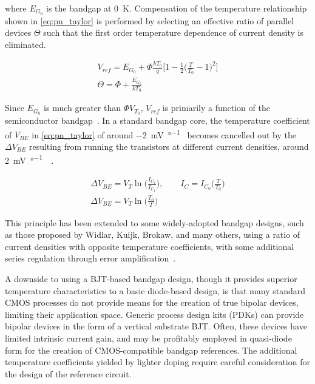 \documentclass[journal]{IEEEtran}
\begin{document}
\noindent where \(E_{G_0}\) is the bandgap at \qty{0}{\K}. Compensation of the temperature relationship shown in \cref{eq:pn_taylor} is performed by selecting an effective ratio of parallel devices \(\Theta\) such that the first order temperature dependence of current density is eliminated.

\begin{gather}
    V_{ref} = E_{G_0} + \Phi\frac{kT_0}{q}\biggl[1 - \frac{1}{2}\biggl(\frac{T}{T_0} - 1\biggr)^2\biggr] \label{eq:bg_vout}\\
    \Theta = \Phi + \frac{E_{G_0}}{kT_0} \label{eq:hilbiber}
\end{gather}

\noindent Since \(E_{G_0}\) is much greater than \(\Phi V_{T_0}\), \(V_{ref}\) is primarily a function of the semiconductor bandgap~\cite{Hibiber1964}. In a standard bandgap core, the temperature coefficient of \(V_{BE}\) in \cref{eq:pn_taylor} of around \qty{-2}{\mV\per\degree\C} becomes cancelled out by the \(\Delta V_{BE}\) resulting from running the transistors at different current densities, around \qty{+2}{\mV\per\degree\C}~\cite{Widlar1967,Pease1990}. 

\begin{gather}
    \Delta V_{BE} = V_T \ln{\Biggl(\frac{I_{C_2}}{I_{C_1}}\Biggr)}, \qquad I_C = I_{C_0}\biggl(\frac{T}{T_0}\biggr) \nonumber \\
    \Delta V_{BE} = V_T \ln{\biggl(\frac{T_0}{T}\biggr)} \label{eq:d_vbe}
\end{gather}

This principle has been extended to some widely-adopted bandgap designs, such as those proposed by Widlar, Kuijk, Brokaw, and many others, using a ratio of current densities with opposite temperature coefficients, with some additional series regulation through error amplification~\cite{Widlar1971,Kuijk1973,Brokaw1974}.

A downside to using a BJT-based bandgap design, though it provides superior temperature characteristics to a basic diode-based design, is that many standard CMOS processes do not provide means for the creation of true bipolar devices, limiting their application space. Generic process design kits (PDKs) can provide bipolar devices in the form of a vertical substrate BJT. Often, these devices have limited intrinsic current gain, and may be profitably employed in quasi-diode form for the creation of CMOS-compatible bandgap references. The additional temperature coefficients yielded by lighter doping require careful consideration for the design of the reference circuit.
\end{document}
